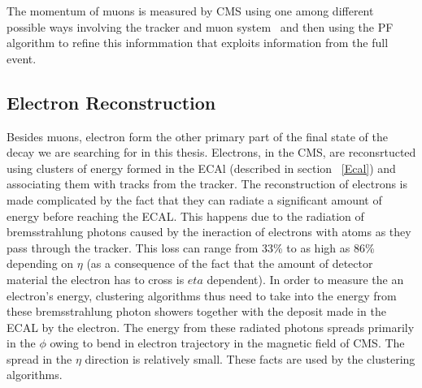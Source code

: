 The momentum of muons is measured by CMS using one among different possible ways involving the tracker and muon system~\cite{muon_recon2012} and then using the PF algorithm to refine this informmation that exploits information from the full event.








\subsection{Electron Reconstruction}
\label{e_recon}
Besides muons, electron form the other primary part of the final state of the decay we are searching for in this thesis. Electrons, in the CMS, are reconsrtucted using clusters of energy formed in the ECAl (described in section ~\ref{Ecal}) and associating them with tracks from the tracker. The reconstruction of electrons is made complicated by the fact that they can radiate a significant amount of energy before reaching the ECAL. This happens due to the radiation of bremsstrahlung photons caused by the ineraction of electrons with atoms as they pass through the tracker. This loss can range from 33\% to as high as 86\% depending on $\eta$ (as a consequence of the fact that the amount of detector material the electron has to cross is $eta$ dependent). In order to measure the an electron's energy,  clustering algorithms thus need to take into the energy from these bremsstrahlung photon showers together with the deposit made in the ECAL by the electron. The energy from these radiated photons spreads primarily in the $\phi$ owing to bend in electron trajectory in the magnetic field of CMS. The spread in the $\eta$ direction is relatively small. These facts are used by the clustering algorithms.

